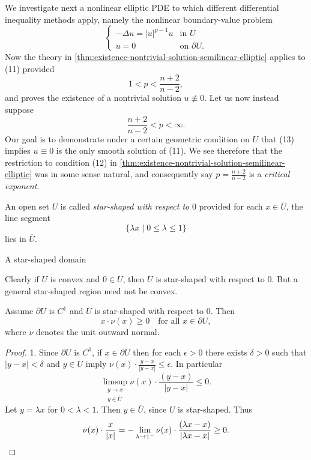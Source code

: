 We investigate next a nonlinear elliptic PDE to which different differential inequality methods apply, namely the nonlinear boundary-value problem
\[
\begin{cases}
-\Delta u = |u|^{p-1} u & \text{in } U \\
u = 0 & \text{on } \partial U.
\end{cases}
\tag{11}
\]
Now the theory in \cref{thm:existence-nontrivial-solution-semilinear-elliptic} applies to (11) provided
\[
1 < p < \frac{n+2}{n-2},
\tag{12}
\]
and proves the existence of a nontrivial solution $u \not\equiv 0$. Let us now instead suppose
\[
\frac{n+2}{n-2} < p < \infty.
\tag{13}
\]
Our goal is to demonstrate under a certain geometric condition on $U$ that (13) implies $u \equiv 0$ is the only smooth solution of (11). We see therefore that the restriction to condition (12) in \cref{thm:existence-nontrivial-solution-semilinear-elliptic} was in some sense natural, and consequently say $p = \frac{n+2}{n-2}$ is a \textit{critical exponent}.

\begin{definition}
\label{def:star-shaped-domain}
An open set $U$ is called \textit{star-shaped with respect to} $0$ provided for each $x \in \overline{U}$, the line segment
\[
\{\lambda x \mid 0 \leq \lambda \leq 1\}
\]
lies in $\overline{U}$.
\end{definition}

\begin{figure}[h]\centering
\end{figure}

A star-shaped domain

Clearly if $U$ is convex and $0 \in U$, then $U$ is star-shaped with respect to 0. But a general star-shaped region need not be convex.

\begin{lemma}
\label{lem:normals-star-shaped-region}
Assume $\partial U$ is $C^1$ and $U$ is star-shaped with respect to 0. Then
\[
x \cdot \nu(x) \geq 0 \quad \text{for all } x \in \partial U,
\]
where $\nu$ denotes the unit outward normal.
\end{lemma}
\begin{proof}
1. Since $\partial U$ is $C^1$, if $x \in \partial U$ then for each $\epsilon > 0$ there exists $\delta > 0$ such that $|y - x| < \delta$ and $y \in \overline{U}$ imply $\nu(x) \cdot \frac{y-x}{|y-x|} \leq \epsilon$. In particular
\[
\limsup_{\substack{y \to x \\ y \in \overline{U}}} \nu(x) \cdot \frac{(y-x)}{|y-x|} \leq 0.
\]
Let $y = \lambda x$ for $0 < \lambda < 1$. Then $y \in \overline{U}$, since $U$ is star-shaped. Thus
\[
\nu(x) \cdot \frac{x}{|x|} = - \lim_{\lambda \to 1^-} \nu(x) \cdot \frac{(\lambda x - x)}{|\lambda x - x|} \geq 0. \qedhere
\]
\end{proof}

